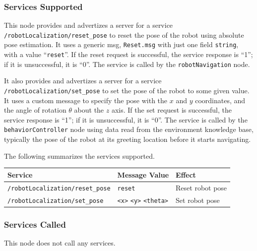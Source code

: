 \documentclass{CSSRforAfrica}
\begin{document}
{{\subsubsection*{Services Supported}
This node  provides and advertizes a server for a service {\small \verb+/robotLocalization/reset_pose+} to reset the pose of the robot using absolute pose estimation.   It uses a generic msg, {\small \verb+Reset.msg+} with just one field  {\small \verb+string+}, with a value ``{\small \verb+reset+}''.  If the reset request is successful, the service response is ``1''; if it is unsuccessful, it is ``0''.  
The service is called by  the {\small \verb+robotNavigation+} node.

It also  provides and advertizes a server for a service {\small \verb+/robotLocalization/set_pose+} to set the pose of the robot to some given value.   
It uses a custom message to specify the pose with the $x$ and $y$ coordinates, and the angle of rotation $\theta$ about the  $z$ axis.  If the set request is successful, the service response is ``1''; if it is unsuccessful, it is ``0''.  
The service is called by  the {\small \verb+behaviorController+} node using data read from the environment knowledge base, typically the pose of the robot at its greeting location before it starts navigating.

The following summarizes the services supported.

\begin{center}
\begin{tabularx}{\linewidth}{| l | l | X|}
\hline 
{\small Service }                                                                                & {\small Message Value}    &  {\small Effect}       \\
\hline
{\footnotesize \verb+/robotLocalization/reset_pose+ }  & {\footnotesize \verb+reset+ } & {\small Reset robot pose} \\ 
\hline
{\footnotesize \verb+/robotLocalization/set_pose+ }  & {\footnotesize \verb+<x>+ \verb+<y>+  \verb+<theta>+}  & {\small Set robot pose} \\ 
\hline
\end{tabularx}
\end{center}


\subsubsection*{Services Called}
This node does not call any services.










}}
\end{document}
